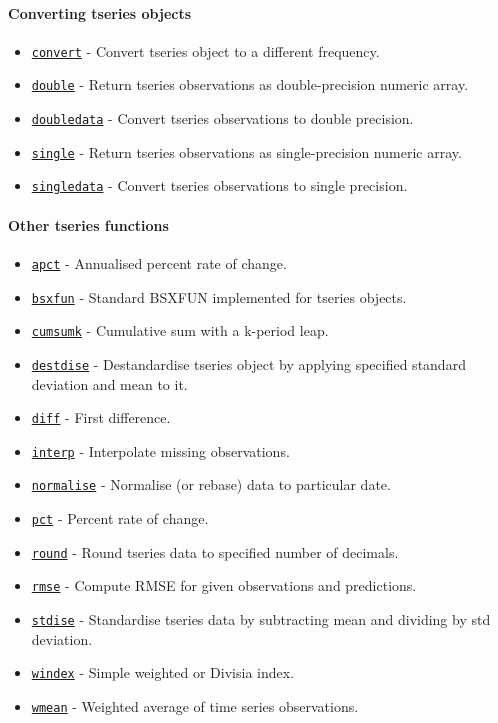  \paragraph{Converting tseries objects}
 
 \begin{itemize}
 \item
   \href{tseries/convert}{\texttt{convert}} - Convert tseries object to a
   different frequency.
 \item
   \href{tseries/double}{\texttt{double}} - Return tseries observations
   as double-precision numeric array.
 \item
   \href{tseries/doubledata}{\texttt{doubledata}} - Convert tseries
   observations to double precision.
 \item
   \href{tseries/single}{\texttt{single}} - Return tseries observations
   as single-precision numeric array.
 \item
   \href{tseries/singledata}{\texttt{singledata}} - Convert tseries
   observations to single precision.
 \end{itemize}
 
 \paragraph{Other tseries functions}
 
 \begin{itemize}
 \item
   \href{tseries/apct}{\texttt{apct}} - Annualised percent rate of
   change.
 \item
   \href{tseries/bsxfun}{\texttt{bsxfun}} - Standard BSXFUN implemented
   for tseries objects.
 \item
   \href{tseries/cumsumk}{\texttt{cumsumk}} - Cumulative sum with a
   k-period leap.
 \item
   \href{tseries/destdise}{\texttt{destdise}} - Destandardise tseries
   object by applying specified standard deviation and mean to it.
 \item
   \href{tseries/diff}{\texttt{diff}} - First difference.
 \item
   \href{tseries/interp}{\texttt{interp}} - Interpolate missing
   observations.
 \item
   \href{tseries/normalise}{\texttt{normalise}} - Normalise (or rebase)
   data to particular date.
 \item
   \href{tseries/pct}{\texttt{pct}} - Percent rate of change.
 \item
   \href{tseries/round}{\texttt{round}} - Round tseries data to specified
   number of decimals.
 \item
   \href{tseries/rmse}{\texttt{rmse}} - Compute RMSE for given
   observations and predictions.
 \item
   \href{tseries/stdise}{\texttt{stdise}} - Standardise tseries data by
   subtracting mean and dividing by std deviation.
 \item
   \href{tseries/windex}{\texttt{windex}} - Simple weighted or Divisia
   index.
 \item
   \href{tseries/wmean}{\texttt{wmean}} - Weighted average of time series
   observations.
 \end{itemize}
 
